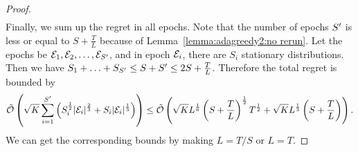 \begin{proof}
\begin{align*}
\end{align*}
Finally, we sum up the regret in all epochs. Note that the number of epochs $S^\prime$ is less or equal to $S+\frac{T}{L}$ because of Lemma~\ref{lemma:adagreedy2:no rerun}. Let the epochs be ${\mathcal{E}}_1, {\mathcal{E}}_2, \ldots, {\mathcal{E}}_{S^\prime}$, and in epoch ${\mathcal{E}}_i$, there are $S_i$ stationary distributions. Then we have $S_1+\ldots+S_{S^\prime}\leq S+S^\prime\leq 2S+\frac{T}{L}$. Therefore the total regret is bounded by 
\begin{align*}
\tilde{\mathcal{O}}\left( \sqrt{K}\sum_{i=1}^{S^\prime} \left(S_i^{\frac{1}{2}}\lvert{\mathcal{E}}_i\rvert^{\frac{2}{3}} + S_i\lvert{\mathcal{E}}_i\rvert^{\frac{1}{3}}\right) \right)\leq \tilde{\mathcal{O}}\left( \sqrt{K}L^{\frac{1}{6}}\left(S+\frac{T}{L}\right)^{\frac{1}{2}}T^{\frac{1}{2}} +\sqrt{K}L^{\frac{1}{3}}\left(S+\frac{T}{L}\right) \right). 
\end{align*}
We can get the corresponding bounds by making $L=T/S$ or $L=T$. 
\end{proof}

